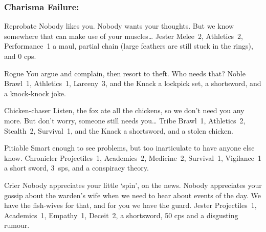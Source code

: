 \begin{multicols}{2}
\begin{itemize}
\end{itemize}

\needspace{10em}
\subsubsection{Charisma Failure:}

\begin{itemize}

  {Reprobate}%
  {Nobody likes you.
  Nobody wants your thoughts.
  But we know somewhere that can make use of your muscles\ldots
  }%
  {Jester}%
  {Melee~2, Athletics~2, Performance~1}%
  {a maul, partial chain (large feathers are still stuck in the rings), and 0 \glspl{cp}.}%

  {Rogue}%
  {You argue and complain, then resort to theft.
  Who needs that?
  }%
  {Noble}%
  {Brawl~1, Athletics~1, Larceny~3, and the Knack \lucky}%
  {a lockpick set, a shortsword, and a knock-knock joke.}%

  {Chicken-chaser}%
  {Listen, the fox ate all the chickens, so we don't need you any more.
  But don't worry, someone still needs you\ldots
  }%
  {Tribe}%
  {Brawl~1, Athletics~2, Stealth~2, Survival~1, and the Knack \lucky}%
  {a shortsword, and a stolen chicken.}%

  {Pitiable}%
  {Smart enough to see problems, but too inarticulate to have anyone else know.
  }%
  {Chronicler}%
  {Projectiles~1, Academics~2, Medicine~2, Survival~1, Vigilance~1}%
  {a short sword, 3~\glspl{sp}, and a conspiracy theory.}%

  {Crier}%
  {Nobody appreciates your little `spin', on the news.
  Nobody appreciates your gossip about the warden's wife when we need to hear about events of the day.
  We have the fish-wives for that, and for you we have the \gls{guard}.
  }%
  {Jester}%
  {Projectiles~1, Academics~1, Empathy~1, Deceit~2, }%
  {a shortsword, 50 \glspl{cp} and a disgusting rumour.}%

\end{itemize}

\end{multicols}

